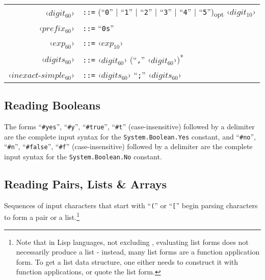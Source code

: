 \grammar
\begin{longtable}{ r l }
  ‹$digit_{60}$› & \lstinline!::=! (``\lstinline!0!'' | ``\lstinline!1!'' | ``\lstinline!2!'' | ``\lstinline!3!'' | ``\lstinline!4!'' | ``\lstinline!5!'')\textsubscript{opt} ‹$digit_{10}$› \\
  ‹$prefix_{60}$› & \lstinline!::=! ``\lstinline!0s!'' \\
  ‹$exp_{60}$› & \lstinline!::=! ‹$exp_{10}$› \\
  
  ‹$digits_{60}$› & \lstinline!::=! ‹$digit_{60}$› (``\lstinline!,!'' ‹$digit_{60}$›)\textsuperscript{*} \\
  ‹$inexact$-$simple_{60}$› & \lstinline!::=! ‹$digits_{60}$› ``\lstinline!;!'' ‹$digits_{60}$› \\
\end{longtable}






\subsection{Reading Booleans}
\label{subsec:aml-base-lang-reader-booleans}

The forms ``\lstinline!#yes!'', ``\lstinline!#y!'', ``\lstinline!#true!'', ``\lstinline!#t!'' (case-insensitive) followed by a delimiter are the complete input syntax for the \lstinline!System.Boolean.Yes! constant, and ``\lstinline!#no!'', ``\lstinline!#n!'', ``\lstinline!#false!'', ``\lstinline!#f!'' (case-insensitive) followed by a delimiter are the complete input syntax for the \lstinline!System.Boolean.No! constant.





\subsection{Reading Pairs, Lists \& Arrays}
\label{subsec:aml-base-lang-reader-lists}

Sequences of input characters that start with ``\lstinline!(!'' or ``\lstinline![!'' begin parsing characters to form a pair or a list.\footnote{Note that in Lisp languages, not excluding \AmlBase, evaluating list forms does not necessarily produce a list - instead, many list forms are a function application form. To get a list data structure, one either needs to construct it with function applications, or quote the list form.}

